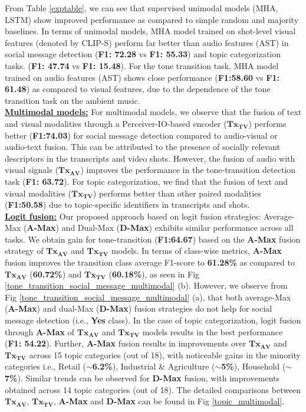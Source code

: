 From Table \ref{exptable}, we can see that supervised unimodal models (MHA, LSTM) show improved performance as compared to simple random and majority baselines. In terms of unimodal models, MHA model trained on shot-level visual features (denoted by CLIP-S) perform far better than audio features (AST) in social message detection (\textbf{F1: 72.28} vs \textbf{F1: 55.33}) and topic categorization tasks.
(\textbf{F1: 47.74} vs \textbf{F1: 15.48}). For the tone transition task, MHA model trained on audio features (AST) shows close performance (\textbf{F1:58.60} vs \textbf{F1: 61.48}) as compared to visual features, due to the dependence of the tone transition task on the ambient music. \\
\textbf{\underline{Multimodal models:}} For multimodal models, we observe that the fusion of text and visual modalities through a Perceiver-IO-based encoder ($\mathbf{Tx_{TV}}$) performs better (\textbf{F1:74.03}) for social message detection compared to audio-visual or audio-text fusion. This can be attributed to the presence of socially relevant descriptors in the transcripts and video shots. However, the fusion of audio with visual signals ($\mathbf{Tx_{AV}}$) improves the performance in the tone-transition detection task (\textbf{F1: 63.72}). For topic categorization, we find that the fusion of text and visual modalities ($\mathbf{Tx_{TV}}$) performs better than other paired modalities (\textbf{F1:50.58}) due to topic-specific identifiers in transcripts and shots. 
\\
 \textbf{\underline{Logit fusion:}} Our proposed approach based on logit fusion strategies: Average-Max (\textbf{A-Max}) and Dual-Max (\textbf{D-Max}) exhibits similar performance across all tasks. We obtain gain for tone-transition (\textbf{F1:64.67}) based on the \textbf{A-Max} fusion strategy of $\mathbf{Tx_{AV}}$ and $\mathbf{Tx_{TV}}$ models. In terms of class-wise metrics, \textbf{A-Max} fusion improves the transition class average F1-score to \textbf{61.28\%} as compared to $\mathbf{Tx_{AV}}$ (\textbf{60.72\%}) and $\mathbf{Tx_{TV}}$ (\textbf{60.18\%}), as seen in Fig \ref{tone_transition_social_message_multimodal} (b). However, we observe from Fig \ref{tone_transition_social_message_multimodal} (a), that both average-Max (\textbf{A-Max}) and dual-Max (\textbf{D-Max}) fusion strategies do not help for social message detection (i.e., \textbf{Yes} class).
 In the case of topic categorization, logit fusion through \textbf{A-Max} of $\mathbf{Tx_{AV}}$ and $\mathbf{Tx_{TV}}$ models results in the best performance (\textbf{F1: 54.22}). Further, \textbf{A-Max} fusion results in improvements over $\mathbf{Tx_{AV}}$ and $\mathbf{Tx_{TV}}$ across 15 topic categories (out of 18), with noticeable gains in the minority categories i.e., Retail ($\sim${\textbf{6.2\%}}), Industrial \& Agriculture ($\sim$\textbf{5\%}), Household ($\sim$\textbf{7\%}). Similar trends can be observed for \textbf{D-Max} fusion, with improvements obtained across 14 topic categories (out of 18). The detailed comparisons between $\mathbf{Tx_{AV}}$,  $\mathbf{Tx_{TV}}$, \textbf{A-Max} and \textbf{D-Max} can be found in Fig \ref{topic_multimodal}.


